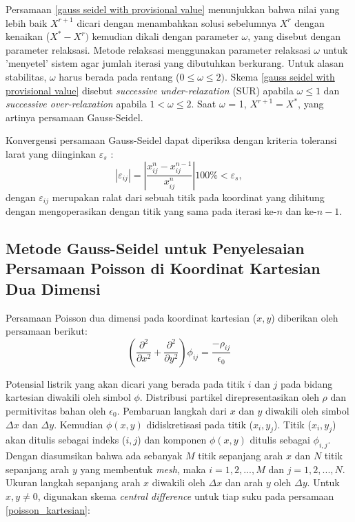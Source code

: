 Persamaan \eqref{gauss seidel with provisional value} menunjukkan bahwa nilai yang lebih baik $X^{r+1}$ dicari dengan menambahkan solusi sebelumnya $X^r$ dengan kenaikan ($X^* - X^r)$ kemudian dikali dengan parameter $\omega$, yang disebut dengan parameter relaksasi. Metode relaksasi menggunakan parameter relaksasi $\omega$ untuk 'menyetel' sistem agar jumlah iterasi yang dibutuhkan berkurang. Untuk alasan stabilitas, $\omega$ harus berada pada rentang ($0 \le \omega \le 2).$ Skema \eqref{gauss seidel with provisional value} disebut \emph{successive under-relaxation} (SUR) apabila $\omega \le 1$ dan \emph{successive over-relaxation} apabila $1 < \omega \le 2$. Saat $\omega$ = 1, $X^{r+1} = X^*$, yang artinya persamaan Gauss-Seidel. 

Konvergensi persamaan Gauss-Seidel dapat diperiksa dengan kriteria toleransi larat yang diinginkan $\varepsilon_s$ \citep{chapra2015}:
\begin{equation}
    |\varepsilon_{ij}| = \left|\frac{x_{ij}^n-x_{ij}^{n-1}}{x_{ij}^n}\right| 100\% < \varepsilon_s,
\end{equation}
dengan $\varepsilon_{ij}$ merupakan ralat dari sebuah titik pada koordinat yang dihitung dengan mengoperasikan dengan titik yang sama pada iterasi ke-$n$ dan ke-$n-1$.     

\subsection{Metode Gauss-Seidel untuk Penyelesaian Persamaan Poisson di Koordinat Kartesian Dua Dimensi}
Persamaan Poisson dua dimensi pada koordinat kartesian ($x,y$) diberikan oleh persamaan berikut:
\begin{equation}\label{poisson_kartesian}
    \left(\frac{\partial^2}{\partial x^2} + \frac{\partial^2}{\partial y^2}\right) \phi_{ij} = \frac{-\rho_{ij}}{\epsilon_{0}}
\end{equation}

Potensial listrik yang akan dicari yang berada pada titik $i$ dan $j$ pada bidang kartesian diwakili oleh simbol $\phi$. Distribusi partikel direpresentasikan oleh $\rho$ dan permitivitas bahan oleh $\epsilon_0$. Pembaruan langkah dari $x$ dan $y$ diwakili oleh simbol $\Delta x$ dan $\Delta y$. Kemudian $\phi(x,y)$ didiskretisasi pada titik ($x_i, y_j$). Titik ($x_i, y_j$) akan ditulis sebagai indeks ($i,j$) dan komponen $\phi(x,y)$ ditulis sebagai $\phi_{i,j}$. Dengan diasumsikan bahwa ada sebanyak $M$ titik sepanjang arah $x$ dan $N$ titik sepanjang arah $y$ yang membentuk \emph{mesh}, maka $i = 1, 2, ..., M$ dan $j = 1,2, ...,N$. Ukuran langkah sepanjang arah $x$ diwakili oleh $\Delta x$ dan arah $y$ oleh $\Delta y$. Untuk $x,y \neq 0$, digunakan skema \emph{central difference} untuk tiap suku pada persamaan \eqref{poisson_kartesian}:

